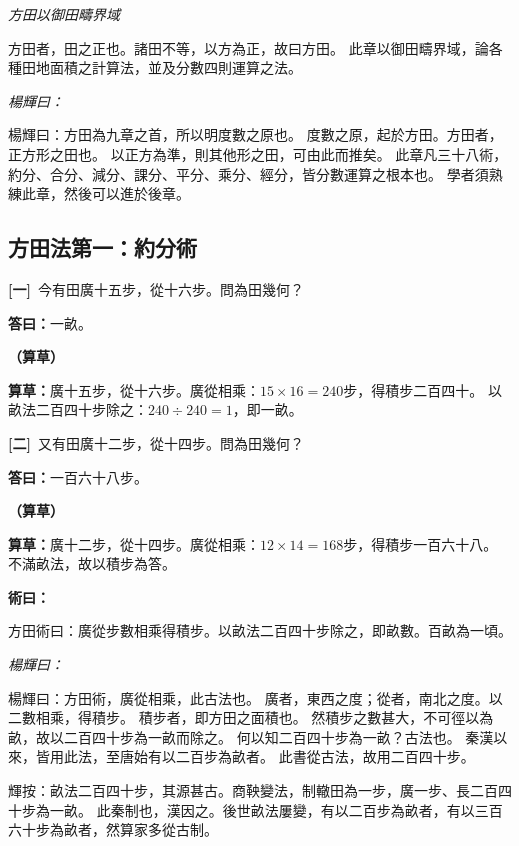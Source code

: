 \documentclass[11pt,a4paper]{article}
\newenvironment{method}{%
  \par\noindent\textcolor{methodcolor}{\textbf{術曰：}}%
  \ignorespaces
}{\par\vspace{0.5em}}
\newenvironment{caocao}{%
  \par\noindent\textcolor{caocaocolor}{\small\textbf{（算草）}}%
  \ignorespaces
}{\par\vspace{0.5em}}
\newenvironment{yanghuicomment}{%
  \par\noindent\textcolor{commentarycolor}{\small\textit{楊輝曰：}}%
  \ignorespaces
}{\par\vspace{0.5em}}
\newcommand{\problemnum}[1]{\textbf{[\ignorespaces#1\unskip]}}
\begin{document}
\begin{center}
\textit{方田以御田疇界域}
\end{center}

方田者，田之正也。諸田不等，以方為正，故曰方田。
此章以御田疇界域，論各種田地面積之計算法，並及分數四則運算之法。

\begin{yanghuicomment}
楊輝曰：方田為九章之首，所以明度數之原也。
度數之原，起於方田。方田者，正方形之田也。
以正方為準，則其他形之田，可由此而推矣。
此章凡三十八術，約分、合分、減分、課分、平分、乘分、經分，皆分數運算之根本也。
學者須熟練此章，然後可以進於後章。
\end{yanghuicomment}

\subsection{方田法第一：約分術}

\noindent\problemnum{一}\,
今有田廣十五步，從十六步。問為田幾何？

\noindent\textcolor{answercolor}{\textbf{答曰：}}一畝。

\begin{caocao}
\textbf{算草：}廣十五步，從十六步。廣從相乘：$15 \times 16 = 240$步，得積步二百四十。
以畝法二百四十步除之：$240 \div 240 = 1$，即一畝。
\end{caocao}

\noindent\problemnum{二}\,
又有田廣十二步，從十四步。問為田幾何？

\noindent\textcolor{answercolor}{\textbf{答曰：}}一百六十八步。

\begin{caocao}
\textbf{算草：}廣十二步，從十四步。廣從相乘：$12 \times 14 = 168$步，得積步一百六十八。
不滿畝法，故以積步為答。
\end{caocao}

\begin{method}
方田術曰：廣從步數相乘得積步。以畝法二百四十步除之，即畝數。百畝為一頃。
\end{method}

\begin{yanghuicomment}
楊輝曰：方田術，廣從相乘，此古法也。
廣者，東西之度；從者，南北之度。以二數相乘，得積步。
積步者，即方田之面積也。
然積步之數甚大，不可徑以為畝，故以二百四十步為一畝而除之。
何以知二百四十步為一畝？古法也。
秦漢以來，皆用此法，至唐始有以二百步為畝者。
此書從古法，故用二百四十步。

輝按：畝法二百四十步，其源甚古。商鞅變法，制轍田為一步，廣一步、長二百四十步為一畝。
此秦制也，漢因之。後世畝法屢變，有以二百步為畝者，有以三百六十步為畝者，然算家多從古制。
\end{yanghuicomment}
\end{document}
